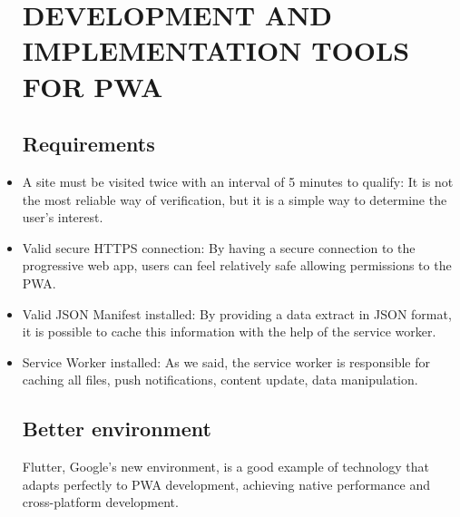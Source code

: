 \documentclass{article}
\begin{document}
\begin{itemize}
\section{DEVELOPMENT AND IMPLEMENTATION TOOLS FOR PWA}

\subsection{Requirements}
\item A site must be visited twice with an interval of 5 minutes to qualify: It is not the most reliable way of verification, but it is a simple way to determine the user's interest.
\item Valid secure HTTPS connection: By having a secure connection to the progressive web app, users can feel relatively safe allowing permissions to the PWA.
\item Valid JSON Manifest installed: By providing a data extract in JSON format, it is possible to cache this information with the help of the service worker. 
\item Service Worker installed: As we said, the service worker is responsible for caching all files, push notifications, content update, data manipulation.

\subsection{Better environment}
Flutter, Google's new environment, is a good example of technology that adapts perfectly to PWA development, achieving native performance and cross-platform development.

\end{itemize}
\end{document}
